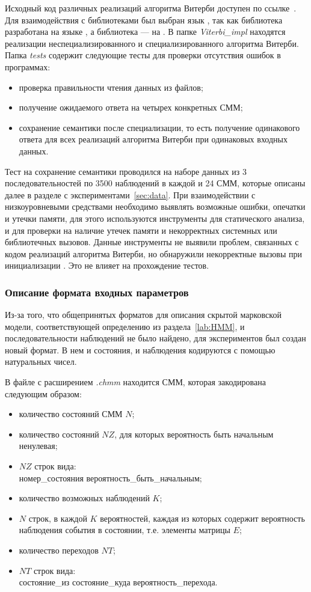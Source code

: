 Исходный код различных реализаций алгоритма Витерби доступен 
по ссылке~\cite{repo}.
Для взаимодействия с библиотеками был выбран язык 
\CPP, так как библиотека  
разработана на языке , а библиотека  --- на \CPP.
В папке \emph{Viterbi\_impl} находятся реализации
неспециализированного и специализированного алгоритма Витерби.
Папка \emph{tests} содержит следующие тесты для проверки 
отсутствия ошибок в программах:
\begin{itemize}
	\item проверка правильности чтения данных из файлов;
	\item получение ожидаемого ответа на четырех конкретных СММ;
	\item сохранение семантики после специализации, то есть 
	получение одинакового ответа для всех реализаций 
	алгоритма Витерби при одинаковых входных данных.
\end{itemize}
Тест на сохранение семантики проводился на наборе данных из 3 последовательностей по 3500 наблюдений в каждой и 24 СММ, которые описаны далее в разделе с экспериментами~\ref{sec:data}.
При взаимодействии с низкоуровневыми средствами
необходимо выявлять возможные ошибки, опечатки и утечки 
памяти, для этого используются инструменты  
для статического анализа,  и  для проверки на 
наличие утечек памяти и некорректных системных или 
библиотечных вызовов.
Данные инструменты не выявили проблем, связанных с кодом 
реализаций алгоритма Витерби, но обнаружили некорректные 
вызовы при инициализации .
Это не влияет на прохождение тестов.

\subsubsection{Описание формата входных параметров}
\label{lab:formats}
Из-за того, что общепринятых форматов для описания скрытой 
марковской модели, соответствующей определению из 
раздела~\ref{lab:HMM}, и последовательности наблюдений не 
было найдено, для экспериментов был создан новый формат.
В нем и состояния, и наблюдения кодируются с помощью 
натуральных чисел.

В файле с расширением \emph{.chmm} находится СММ, которая закодирована следующим образом:
\begin{itemize}
	\item количество состояний СММ $N$;
	\item количество состояний $NZ$, для которых вероятность быть начальным ненулевая;
	\item $NZ$ строк вида:\\ 
	номер\_состояния вероятность\_быть\_начальным;
	\item количество возможных наблюдений $K$;
	\item $N$ строк, в каждой $K$ вероятностей, каждая из которых содержит вероятность наблюдения события в состоянии, т.е. элементы матрицы $E$;
	\item количество переходов $NT$;
	\item $NT$ строк вида:\\ состояние\_из состояние\_куда вероятность\_перехода.
\end{itemize}

